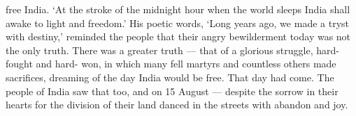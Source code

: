 free India. `At the stroke of the midnight hour when the world sleeps India shall awake to light and freedom.' His poetic words, `Long years ago, we made a tryst with destiny,' reminded the people that their angry bewilderment today was not the only truth. There was a greater truth — that of a glorious struggle, hard-fought and hard- won, in which many fell martyrs and countless others made sacrifices, dreaming of the day India would be free. That day had come. The people of India saw that too, and on 15 August — despite the sorrow in their hearts for the division of their land danced in the streets with abandon and joy.

